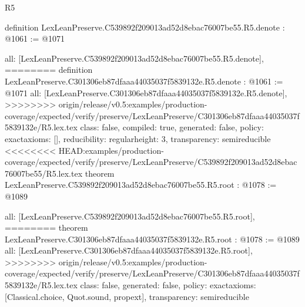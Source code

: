 \begin{lexlean}{R5}
\begin{coremodule}
{{{{{{{definition LexLeanPreserve.C539892f209013ad52d8ebac76007be55.R5.denote : @1061 := @1071 {
  all: [LexLeanPreserve.C539892f209013ad52d8ebac76007be55.R5.denote],
========
definition LexLeanPreserve.C301306eb87dfaaa44035037f5839132e.R5.denote : @1061 := @1071 {
  all: [LexLeanPreserve.C301306eb87dfaaa44035037f5839132e.R5.denote],
>>>>>>>> origin/release/v0.5:examples/production-coverage/expected/verify/preserve/LexLeanPreserve/C301306eb87dfaaa44035037f5839132e/R5.lex.tex
  class: false,
  compiled: true,
  generated: false,
  policy: exact{axioms: []},
  reducibility: regular{height: 3},
  transparency: semireducible
}
<<<<<<<< HEAD:examples/production-coverage/expected/verify/preserve/LexLeanPreserve/C539892f209013ad52d8ebac76007be55/R5.lex.tex
theorem LexLeanPreserve.C539892f209013ad52d8ebac76007be55.R5.root : @1078 := @1089 {
  all: [LexLeanPreserve.C539892f209013ad52d8ebac76007be55.R5.root],
========
theorem LexLeanPreserve.C301306eb87dfaaa44035037f5839132e.R5.root : @1078 := @1089 {
  all: [LexLeanPreserve.C301306eb87dfaaa44035037f5839132e.R5.root],
>>>>>>>> origin/release/v0.5:examples/production-coverage/expected/verify/preserve/LexLeanPreserve/C301306eb87dfaaa44035037f5839132e/R5.lex.tex
  class: false,
  generated: false,
  policy: exact{axioms: [Classical.choice, Quot.sound, propext]},
  transparency: semireducible
}

}}}}}}}}}
\end{coremodule}
\end{lexlean}
